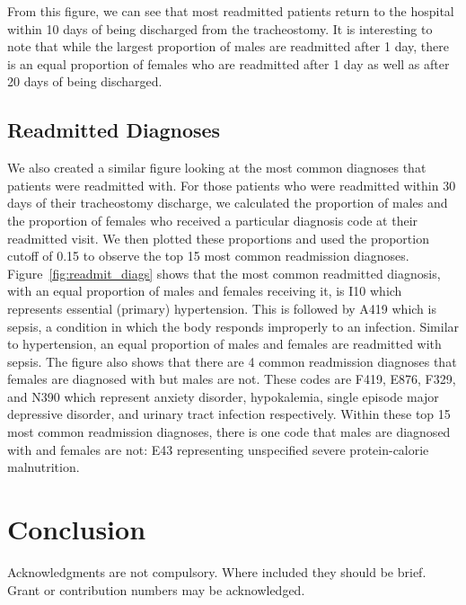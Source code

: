 \documentclass[sn-basic,pdflatex]{sn-jnl}
\theoremstyle{remark}
\theoremstyle{definition}
\begin{document}
From this figure, we can see that most readmitted patients return to the
hospital within 10 days of being discharged from the tracheostomy. It is
interesting to note that while the largest proportion of males are
readmitted after 1 day, there is an equal proportion of females who are
readmitted after 1 day as well as after 20 days of being discharged.

\hypertarget{readmitted-diagnoses}{%
\subsection{Readmitted Diagnoses}\label{readmitted-diagnoses}}

We also created a similar figure looking at the most common diagnoses
that patients were readmitted with. For those patients who were
readmitted within 30 days of their tracheostomy discharge, we calculated
the proportion of males and the proportion of females who received a
particular diagnosis code at their readmitted visit. We then plotted
these proportions and used the proportion cutoff of 0.15 to observe the
top 15 most common readmission diagnoses.\newline \newline
Figure~\ref{fig:readmit_diags} shows that the most common readmitted
diagnosis, with an equal proportion of males and females receiving it,
is I10 which represents essential (primary) hypertension. This is
followed by A419 which is sepsis, a condition in which the body responds
improperly to an infection. Similar to hypertension, an equal proportion
of males and females are readmitted with sepsis. \newline \newline The
figure also shows that there are 4 common readmission diagnoses that
females are diagnosed with but males are not. These codes are F419,
E876, F329, and N390 which represent anxiety disorder, hypokalemia,
single episode major depressive disorder, and urinary tract infection
respectively. Within these top 15 most common readmission diagnoses,
there is one code that males are diagnosed with and females are not: E43
representing unspecified severe protein-calorie malnutrition.

\hypertarget{sec5}{%
\section{Conclusion}\label{sec5}}


Acknowledgments are not compulsory. Where included they should be brief.
Grant or contribution numbers may be acknowledged.
\end{document}
